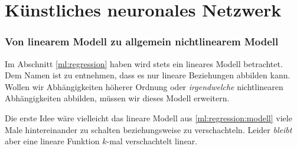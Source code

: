 \section{Künstliches neuronales Netzwerk\label{ml:ann}}

\subsubsection{Von linearem Modell zu allgemein nichtlinearem Modell}

Im Abschnitt \ref{ml:regression} haben wird stets ein lineares Modell betrachtet.
Dem Namen ist zu entnehmen, dass es nur lineare Beziehungen abbilden kann. 
Wollen wir Abhängigkeiten höherer Ordnung oder \emph{irgendwelche} nichtlinearen
Abhängigkeiten abbilden, müssen wir dieses Modell erweitern.

Die erste Idee wäre vielleicht das lineare Modell aus
\eqref{ml:regression:modell} viele Male hintereinander zu schalten beziehungsweise zu
verschachteln. Leider \emph{bleibt} aber eine lineare Funktion $k$-mal verschachtelt
linear.

